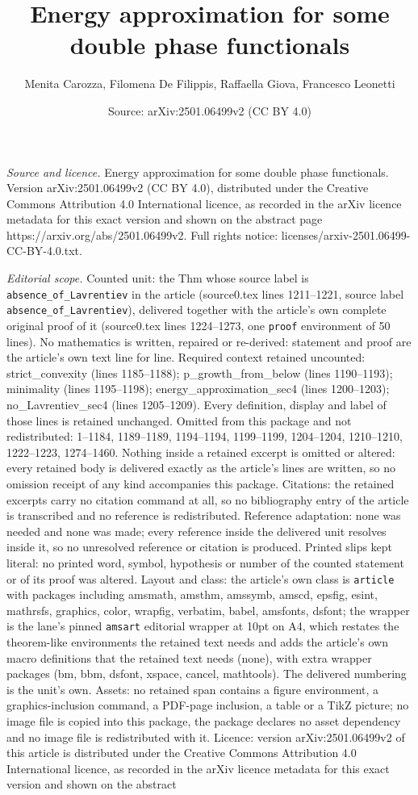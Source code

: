 \documentclass[10pt,a4paper]{amsart}
\title[Energy approximation for some double phase functionals]{Energy approximation for some double phase functionals}
\author{Menita Carozza, Filomena De Filippis, Raffaella Giova, Francesco Leonetti}
\date{Source: arXiv:2501.06499v2 (CC BY 4.0)}
\begin{document}
\maketitle

\noindent\emph{Source and licence.} Energy approximation for some double phase functionals. Version arXiv:2501.06499v2 (CC BY 4.0), distributed under the Creative Commons Attribution 4.0 International licence, as recorded in the arXiv licence metadata for this exact version and shown on the abstract page https://arxiv.org/abs/2501.06499v2. Full rights notice: licenses/arxiv-2501.06499-CC-BY-4.0.txt.\par\smallskip

\noindent\textit{Editorial scope.} Counted unit: the Thm whose source label is \texttt{absence\_of\_Lavrentiev} in the article (source0.tex lines 1211--1221, source label \texttt{absence\_of\_Lavrentiev}), delivered together with the article's own complete original proof of it (source0.tex lines 1224--1273, one \texttt{proof} environment of 50 lines). No mathematics is written, repaired or re-derived: statement and proof are the article's own text line for line. Required context retained uncounted: strict\_convexity (lines 1185--1188); p\_growth\_from\_below (lines 1190--1193); minimality (lines 1195--1198); energy\_approximation\_sec4 (lines 1200--1203); no\_Lavrentiev\_sec4 (lines 1205--1209). Every definition, display and label of those lines is retained unchanged. Omitted from this package and not redistributed: 1--1184, 1189--1189, 1194--1194, 1199--1199, 1204--1204, 1210--1210, 1222--1223, 1274--1460. Nothing inside a retained excerpt is omitted or altered: every retained body is delivered exactly as the article's lines are written, so no omission receipt of any kind accompanies this package. Citations: the retained excerpts carry no citation command at all, so no bibliography entry of the article is transcribed and no reference is redistributed. Reference adaptation: none was needed and none was made; every reference inside the delivered unit resolves inside it, so no unresolved reference or citation is produced. Printed slips kept literal: no printed word, symbol, hypothesis or number of the counted statement or of its proof was altered. Layout and class: the article's own class is \texttt{article} with packages including amsmath, amsthm, amssymb, amscd, epsfig, esint, mathrsfs, graphics, color, wrapfig, verbatim, babel, amsfonts, dsfont; the wrapper is the lane's pinned \texttt{amsart} editorial wrapper at 10pt on A4, which restates the theorem-like environments the retained text needs and adds the article's own macro definitions that the retained text needs (none), with extra wrapper packages (bm, bbm, dsfont, xspace, cancel, mathtools). The delivered numbering is the unit's own. Assets: no retained span contains a figure environment, a graphics-inclusion command, a PDF-page inclusion, a table or a TikZ picture; no image file is copied into this package, the package declares no asset dependency and no image file is redistributed with it. Licence: version arXiv:2501.06499v2 of this article is distributed under the Creative Commons Attribution 4.0 International licence, as recorded in the arXiv licence metadata for this exact version and shown on the abstract 
\end{document}
